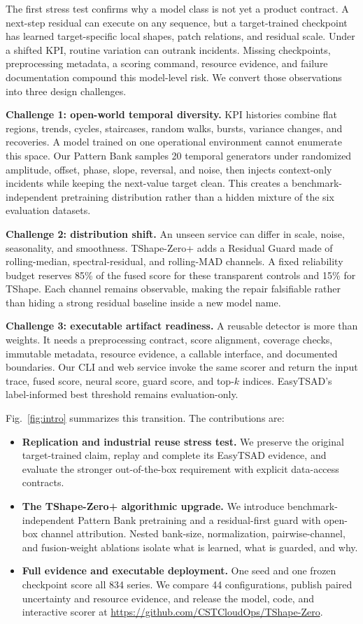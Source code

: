 \documentclass[conference]{IEEEtran}
\newcommand{\method}{TShape-Zero+}
\begin{document}
The first stress test confirms why a model class is not yet a product contract. A next-step residual can execute on any sequence, but a target-trained checkpoint has learned target-specific local shapes, patch relations, and residual scale. Under a shifted KPI, routine variation can outrank incidents. Missing checkpoints, preprocessing metadata, a scoring command, resource evidence, and failure documentation compound this model-level risk. We convert those observations into three design challenges.

\textbf{Challenge 1: open-world temporal diversity.}
KPI histories combine flat regions, trends, cycles, staircases, random walks, bursts, variance changes, and recoveries. A model trained on one operational environment cannot enumerate this space. Our Pattern Bank samples 20 temporal generators under randomized amplitude, offset, phase, slope, reversal, and noise, then injects context-only incidents while keeping the next-value target clean. This creates a benchmark-independent pretraining distribution rather than a hidden mixture of the six evaluation datasets.

\textbf{Challenge 2: distribution shift.}
An unseen service can differ in scale, noise, seasonality, and smoothness. \method{} adds a Residual Guard made of rolling-median, spectral-residual, and rolling-MAD channels. A fixed reliability budget reserves 85\% of the fused score for these transparent controls and 15\% for TShape. Each channel remains observable, making the repair falsifiable rather than hiding a strong residual baseline inside a new model name.

\textbf{Challenge 3: executable artifact readiness.}
A reusable detector is more than weights. It needs a preprocessing contract, score alignment, coverage checks, immutable metadata, resource evidence, a callable interface, and documented boundaries. Our CLI and web service invoke the same scorer and return the input trace, fused score, neural score, guard score, and top-$k$ indices. EasyTSAD's label-informed best threshold remains evaluation-only.

Fig.~\ref{fig:intro} summarizes this transition. The contributions are:
\begin{itemize}
    \item \textbf{Replication and industrial reuse stress test.} We preserve the original target-trained claim, replay and complete its EasyTSAD evidence, and evaluate the stronger out-of-the-box requirement with explicit data-access contracts.
    \item \textbf{The \method{} algorithmic upgrade.} We introduce benchmark-independent Pattern Bank pretraining and a residual-first guard with open-box channel attribution. Nested bank-size, normalization, pairwise-channel, and fusion-weight ablations isolate what is learned, what is guarded, and why.
    \item \textbf{Full evidence and executable deployment.} One seed and one frozen checkpoint score all 834 series. We compare 44 configurations, publish paired uncertainty and resource evidence, and release the model, code, and interactive scorer at \url{https://github.com/CSTCloudOps/TShape-Zero}.
\end{itemize}
\end{document}
